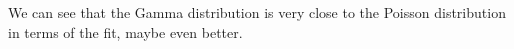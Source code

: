 \documentclass[11pt]{book} %
\begin{document}
We can see that the Gamma distribution is very close to the Poisson distribution in terms of the fit, maybe even better. 













\end{document}
